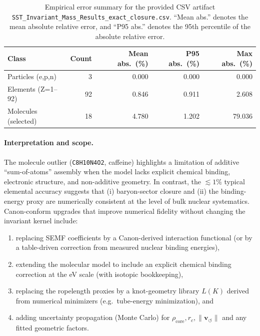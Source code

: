 \documentclass[10pt]{article}
\begin{document}
\begin{table}[t]
\centering
\caption{Empirical error summary for the provided CSV artifact \texttt{SST\_Invariant\_Mass\_Results\_exact\_closure.csv}. ``Mean abs.'' denotes the mean absolute relative error, and ``P95 abs.'' denotes the 95th percentile of the absolute relative error.}
\label{tab:benchmarks_summary}
\begin{tabular}{lrrrr}
\toprule
Class & Count & Mean abs.\ (\%) & P95 abs.\ (\%) & Max abs.\ (\%) \\
\midrule
Particles (e,p,n) & 3 & 0.000 & 0.000 & 0.000 \\
Elements (Z=1--92) & 92 & 0.846 & 0.911 & 2.608 \\
Molecules (selected) & 18 & 4.780 & 1.202 & 79.036 \\
\bottomrule
\end{tabular}
\end{table}

\paragraph{Interpretation and scope.}
The molecule outlier (\texttt{C8H10N4O2}, caffeine) highlights a limitation of additive ``sum-of-atoms'' assembly when the model lacks explicit chemical binding, electronic structure, and non-additive geometry. In contrast, the \(\lesssim 1\%\) typical elemental accuracy suggests that (i) baryon-sector closure and (ii) the binding-energy proxy are numerically consistent at the level of bulk nuclear systematics. Canon-conform upgrades that improve numerical fidelity without changing the invariant kernel include:
\begin{enumerate}
    \item replacing SEMF coefficients by a Canon-derived interaction functional (or by a table-driven correction from measured nuclear binding energies),
    \item extending the molecular model to include an explicit chemical binding correction at the eV scale (with isotopic bookkeeping),
    \item replacing the ropelength proxies by a knot-geometry library \(L(K)\) derived from numerical minimizers (e.g.\ tube-energy minimization), and
    \item adding uncertainty propagation (Monte Carlo) for \(\rho_{\text{core}}, r_c,\lVert \mathbf{v}_{\!\boldsymbol{\circlearrowleft}}\rVert\) and any fitted geometric factors.
\end{enumerate}
\end{document}
